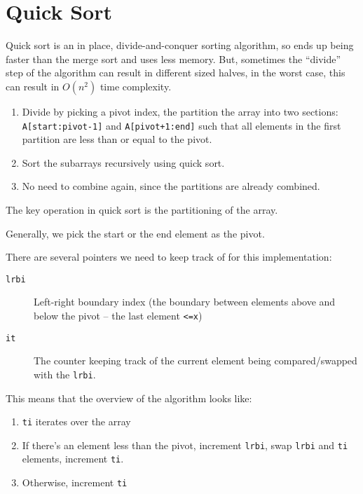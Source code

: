 \section{Quick Sort}\label{sec:quick_sort}

Quick sort is an in place, divide-and-conquer sorting algorithm, so ends up being faster than the merge sort and uses less memory.
But, sometimes the ``divide'' step of the algorithm can result in different sized halves, in the worst case, this can result in \(O(n^2)\) time complexity.

\begin{enumerate}
    \item Divide by picking a pivot index, the partition the array into two sections: \texttt{A[start:pivot-1]} and \texttt{A[pivot+1:end]} such that all elements in the first partition are less than or equal to the pivot.
    \item Sort the subarrays recursively using quick sort.
    \item No need to combine again, since the partitions are already combined.
\end{enumerate}
\begin{note}
    The key operation in quick sort is the partitioning of the array.
\end{note}
\begin{note}
    Generally, we pick the start or the end element as the pivot.
\end{note}
There are several pointers we need to keep track of for this implementation:
\begin{description}
    \item[\texttt{lrbi}] Left-right boundary index (the boundary between elements above and below the pivot -- the last element \texttt{<=x})
    \item[\texttt{it}] The counter keeping track of the current element being compared/swapped with the \texttt{lrbi}.
\end{description}
This means that the overview of the algorithm looks like:
\begin{enumerate}
    \item \texttt{ti} iterates over the array
    \item If there's an element less than the pivot, increment \texttt{lrbi}, swap \texttt{lrbi} and \texttt{ti} elements, increment \texttt{ti}.
    \item Otherwise, increment \texttt{ti}
\end{enumerate}
